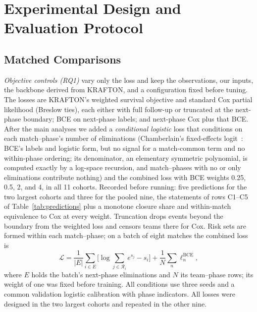 \documentclass[sigconf,anonymous]{acmart}
\begin{document}
\section{Experimental Design and Evaluation Protocol}
\label{sec:method:evaluation}
\subsection{Matched Comparisons}
\label{sec:method:decomposition}
\emph{Objective controls (RQ1)} vary only the loss and keep the observations, our inputs, the backbone derived from KRAFTON, and a configuration fixed before tuning. The losses are KRAFTON's weighted survival objective and standard Cox partial likelihood (Breslow ties), each either with full follow-up or truncated at the next-phase boundary; BCE on next-phase labels; and next-phase Cox plus that BCE. After the main analyses we added a \emph{conditional logistic} loss that conditions on each match--phase's number of eliminations (Chamberlain's fixed-effects logit~\cite{Chamberlain80}: BCE's labels and logistic form, but no signal for a match-common term and no within-phase ordering; its denominator, an elementary symmetric polynomial, is computed exactly by a log-space recursion, and match--phases with no or only eliminations contribute nothing) and the combined loss with BCE weights 0.25, 0.5, 2, and 4, in all 11 cohorts. Recorded before running: five predictions for the two largest cohorts and three for the pooled nine, the statements of rows C1--C5 of Table~\ref{tab:predictions} plus a monotone closure share and within-match equivalence to Cox at every weight. Truncation drops events beyond the boundary from the weighted loss and censors teams there for Cox. Risk sets are formed within each match--phase; on a batch of eight matches the combined loss is
\begin{equation}
\mathcal{L}=\frac{1}{|E|}\sum_{i\in E}\Big[\log\sum_{j\in\mathcal{R}_i}e^{s_j}-s_i\Big]+\frac{1}{N}\sum_{n}\ell^{\mathrm{BCE}}_n,
\label{eq:combined}
\end{equation}
where $E$ holds the batch's next-phase eliminations and $N$ its team--phase rows; its weight of one was fixed before training. All conditions use three seeds and a common validation logistic calibration with phase indicators. All losses were designed in the two largest cohorts and repeated in the other nine.
\end{document}
